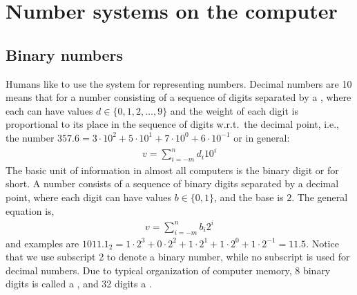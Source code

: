 \chapter{Number systems on the computer}
\section{Binary numbers}
\label{sec:binary}
Humans like to use the  system for representing numbers. Decimal numbers are  10 means that for a number consisting of a sequence of digits separated by a , where each  can have values $d \in \{0,1,2,\ldots,9\}$ and the weight of each digit is proportional to its place in the sequence of digits w.r.t.\ the decimal point, i.e., the number $357.6=3\cdot 10^2+5\cdot 10^1+7\cdot 10^0+6\cdot 10^{-1}$ or in general:
\begin{align}
  v = \sum_{i=-m}^nd_i10^i
\end{align}
The basic unit of information in almost all computers is the binary digit or  for short. A  number consists of a sequence of binary digits separated by a decimal point, where each digit can have values $b \in \{0,1\}$, and the base is $2$. The general equation is,
\begin{align}
  v = \sum_{i=-m}^nb_i2^i
\end{align}
and examples are $1011.1_2 = 1\cdot 2^3+0\cdot 2^2+1\cdot 2^1+1\cdot 2^0+1\cdot 2^{-1} = 11.5$. Notice that we use subscript 2 to denote a binary number, while no subscript is used for decimal numbers. Due to typical organization of computer memory, 8 binary digits is called a , and 32 digits a .

